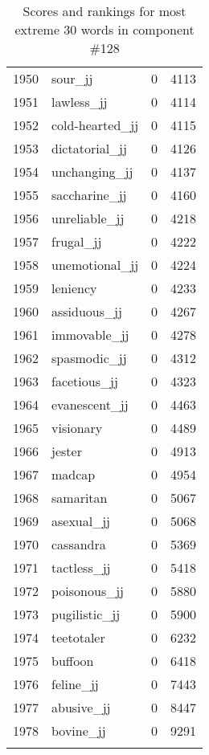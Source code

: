 \begin{longtable}[!htbp]{| rlr@{.}l |}
    1950 & sour\_jj & 0 & 4113 \\
    1951 & lawless\_jj & 0 & 4114 \\
    1952 & cold-hearted\_jj & 0 & 4115 \\
    1953 & dictatorial\_jj & 0 & 4126 \\
    1954 & unchanging\_jj & 0 & 4137 \\
    1955 & saccharine\_jj & 0 & 4160 \\
    1956 & unreliable\_jj & 0 & 4218 \\
    1957 & frugal\_jj & 0 & 4222 \\
    1958 & unemotional\_jj & 0 & 4224 \\
    1959 & leniency & 0 & 4233 \\
    1960 & assiduous\_jj & 0 & 4267 \\
    1961 & immovable\_jj & 0 & 4278 \\
    1962 & spasmodic\_jj & 0 & 4312 \\
    1963 & facetious\_jj & 0 & 4323 \\
    1964 & evanescent\_jj & 0 & 4463 \\
    1965 & visionary & 0 & 4489 \\
    1966 & jester & 0 & 4913 \\
    1967 & madcap & 0 & 4954 \\
    1968 & samaritan & 0 & 5067 \\
    1969 & asexual\_jj & 0 & 5068 \\
    1970 & cassandra & 0 & 5369 \\
    1971 & tactless\_jj & 0 & 5418 \\
    1972 & poisonous\_jj & 0 & 5880 \\
    1973 & pugilistic\_jj & 0 & 5900 \\
    1974 & teetotaler & 0 & 6232 \\
    1975 & buffoon & 0 & 6418 \\
    1976 & feline\_jj & 0 & 7443 \\
    1977 & abusive\_jj & 0 & 8447 \\
    1978 & bovine\_jj & 0 & 9291 \\
    \hline
    \caption{Scores and rankings for most extreme 30 words in component \#128} \\
\end{longtable}
